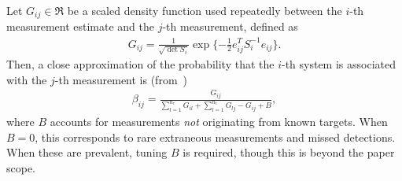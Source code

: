 Let $G_{ij}\in\Re$ be a scaled density function used repeatedly between the $i$-th measurement estimate and the $j$-th measurement, defined as
\begin{align}
G_{ij}=\frac1{\sqrt{\det{S_{i}}}}\exp{\{-\frac12e_{ij}^TS_{i}^{-1}e_{ij}\}}.
\end{align}
Then, a close approximation of the probability that the $i$-th system is associated with the $j$-th measurement is (from~\cite{Bar1990})
\begin{align}
\label{eqn:betaDef}
\beta_{ij}=\frac{G_{ij}}{\sum\limits_{l=1}^{n_r}G_{il}+\sum\limits_{l=1}^{n_t}G_{lj}-G_{ij}+B},
\end{align}
where $B$ accounts for measurements \emph{not} originating from known targets. When $B=0$, this corresponds to rare extraneous measurements and missed detections. When these are prevalent, tuning $B$ is required, though this is beyond the paper scope.






